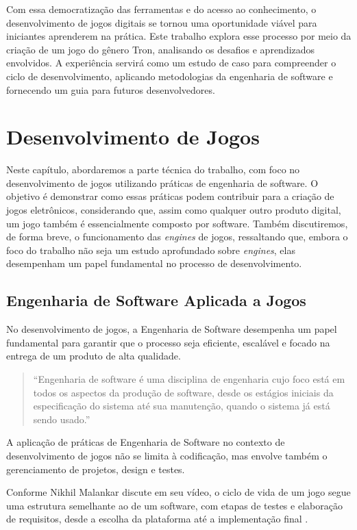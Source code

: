 Com essa democratização das ferramentas e do acesso ao conhecimento, o desenvolvimento de jogos digitais se tornou uma oportunidade viável para iniciantes aprenderem na prática. Este trabalho explora esse processo por meio da criação de um jogo do gênero Tron, analisando os desafios e aprendizados envolvidos. A experiência servirá como um estudo de caso para compreender o ciclo de desenvolvimento, aplicando metodologias da engenharia de software e fornecendo um guia para futuros desenvolvedores.

\section{Desenvolvimento de Jogos}

Neste capítulo, abordaremos a parte técnica do trabalho, com foco no desenvolvimento de jogos utilizando práticas de engenharia de software. O objetivo é demonstrar como essas práticas podem contribuir para a criação de jogos eletrônicos, considerando que, assim como qualquer outro produto digital, um jogo também é essencialmente composto por software. Também discutiremos, de forma breve, o funcionamento das \textit{engines} de jogos, ressaltando que, embora o foco do trabalho não seja um estudo aprofundado sobre \textit{engines}, elas desempenham um papel fundamental no processo de desenvolvimento.

\subsection{Engenharia de Software Aplicada a Jogos}

No desenvolvimento de jogos, a Engenharia de Software desempenha um papel fundamental para garantir que o processo seja eficiente, escalável e focado na entrega de um produto de alta qualidade.

\begin{quote}
\small
``Engenharia de software é uma disciplina de engenharia cujo foco está em todos os aspectos da produção de software, desde os estágios iniciais da especificação do sistema até sua manutenção, quando o sistema já está sendo usado.'' \cite{sommerville2011}
\end{quote}

A aplicação de práticas de Engenharia de Software no contexto de desenvolvimento de jogos não se limita à codificação, mas envolve também o gerenciamento de projetos, design e testes.

Conforme Nikhil Malankar discute em seu vídeo, o ciclo de vida de um jogo segue uma estrutura semelhante ao de um software, com etapas de testes e elaboração de requisitos, desde a escolha da plataforma até a implementação final \cite{malankar2023}.

